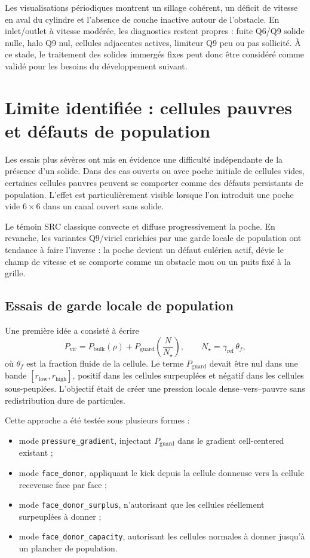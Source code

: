 \documentclass[11pt,a4paper]{article}
\begin{document}
Les visualisations périodiques montrent un sillage cohérent, un déficit de vitesse en aval du cylindre et l'absence de couche inactive autour de l'obstacle. En inlet/outlet à vitesse modérée, les diagnostics restent propres : fuite Q6/Q9 solide nulle, halo Q9 nul, cellules adjacentes actives, limiteur Q9 peu ou pas sollicité. À ce stade, le traitement des solides immergés fixes peut donc être considéré comme validé pour les besoins du développement suivant.

\section{Limite identifiée : cellules pauvres et défauts de population}

Les essais plus sévères ont mis en évidence une difficulté indépendante de la présence d'un solide. Dans des cas ouverts ou avec poche initiale de cellules vides, certaines cellules pauvres peuvent se comporter comme des défauts persistants de population. L'effet est particulièrement visible lorsque l'on introduit une poche vide \(6\times6\) dans un canal ouvert sans solide.

Le témoin SRC classique convecte et diffuse progressivement la poche. En revanche, les variantes Q9/viriel enrichies par une garde locale de population ont tendance à faire l'inverse : la poche devient un défaut eulérien actif, dévie le champ de vitesse et se comporte comme un obstacle mou ou un puits fixé à la grille.

\subsection{Essais de garde locale de population}

Une première idée a consisté à écrire
\[
  P_{\mathrm{vir}} = P_{\mathrm{bulk}}(\rho) + P_{\mathrm{guard}}\left(\frac{N}{N_\star}\right),
  \qquad
  N_\star=\gamma_{\mathrm{ref}}\,\theta_f,
\]
où \(\theta_f\) est la fraction fluide de la cellule. Le terme \(P_{\mathrm{guard}}\) devait être nul dans une bande \([r_{\mathrm{low}},r_{\mathrm{high}}]\), positif dans les cellules surpeuplées et négatif dans les cellules sous-peuplées. L'objectif était de créer une pression locale dense--vers--pauvre sans redistribution dure de particules.

Cette approche a été testée sous plusieurs formes :
\begin{itemize}
  \item mode \texttt{pressure\_gradient}, injectant \(P_{\mathrm{guard}}\) dans le gradient cell-centered existant ;
  \item mode \texttt{face\_donor}, appliquant le kick depuis la cellule donneuse vers la cellule receveuse face par face ;
  \item mode \texttt{face\_donor\_surplus}, n'autorisant que les cellules réellement surpeuplées à donner ;
  \item mode \texttt{face\_donor\_capacity}, autorisant les cellules normales à donner jusqu'à un plancher de population.
\end{itemize}
\end{document}
